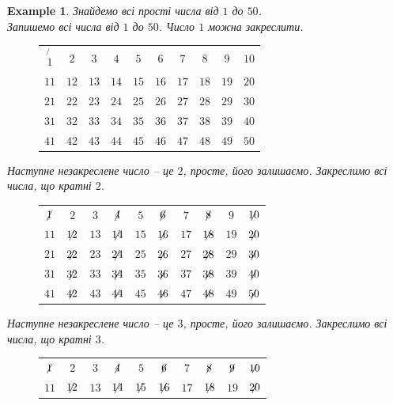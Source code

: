 \documentclass[a4paper, 10pt]{article}
\theoremstyle{theoremdd}
\theoremstyle{theoremdd}
\theoremstyle{theoremdd}
\theoremstyle{theoremdd}
\newtheorem{example}[theorem]{Example}
\theoremstyle{theoremdd}
\theoremstyle{theoremdd}
\theoremstyle{theoremdd}
\theoremstyle{theoremdd}
\begin{document}
\begin{example}
Знайдемо всі прості числа від $1$ до $50$.\\
Запишемо всі числа від $1$ до $50$. Число $1$ можна закреслити.
\begin{figure}[H]
\centering
\begin{tabular}{cccccccccc}
$\not{1}$ & $2$ & $3$ & $4$ & $5$ & $6$ & $7$ & $8$ & $9$ & $10$ \\
$11$ & $12$ & $13$ & $14$ & $15$ & $16$ & $17$ & $18$ & $19$ & $20$ \\
$21$ & $22$ & $23$ & $24$ & $25$ & $26$ & $27$ & $28$ & $29$ & $30$ \\
$31$ & $32$ & $33$ & $34$ & $35$ & $36$ & $37$ & $38$ & $39$ & $40$ \\
$41$ & $42$ & $43$ & $44$ & $45$ & $46$ & $47$ & $48$ & $49$ & $50$
\end{tabular}
\end{figure}
Наступне незакреслене число -- це $2$, просте, його залишаємо. Закреслимо всі числа, що кратні $2$.
\begin{figure}[H]
\centering
\begin{tabular}{cccccccccc}
$\centernot{1}$ & $2$ & $3$ & $\centernot{4}$ & $5$ & $\centernot{6}$ & $7$ & $\centernot{8}$ & $9$ & $\centernot{10}$ \\
$11$ & $\centernot{12}$ & $13$ & $\centernot{14}$ & $15$ & $\centernot{16}$ & $17$ & $\centernot{18}$ & $19$ & $\centernot{20}$ \\
$21$ & $\centernot{22}$ & $23$ & $\centernot{24}$ & $25$ & $\centernot{26}$ & $27$ & $\centernot{28}$ & $29$ & $\centernot{30}$ \\
$31$ & $\centernot{32}$ & $33$ & $\centernot{34}$ & $35$ & $\centernot{36}$ & $37$ & $\centernot{38}$ & $39$ & $\centernot{40}$ \\
$41$ & $\centernot{42}$ & $43$ & $\centernot{44}$ & $45$ & $\centernot{46}$ & $47$ & $\centernot{48}$ & $49$ & $\centernot{50}$
\end{tabular}
\end{figure}
Наступне незакреслене число -- це $3$, просте, його залишаємо. Закреслимо всі числа, що кратні $3$.
\begin{figure}[H]
\centering
\begin{tabular}{cccccccccc}
$\centernot{1}$ & $2$ & $3$ & $\centernot{4}$ & $5$ & $\centernot{6}$ & $7$ & $\centernot{8}$ & $\centernot{9}$ & $\centernot{10}$ \\
$11$ & $\centernot{12}$ & $13$ & $\centernot{14}$ & $\centernot{15}$ & $\centernot{16}$ & $17$ & $\centernot{18}$ & $19$ & $\centernot{20}$ \\

\end{tabular}
\end{figure}
\end{example}
\end{document}
